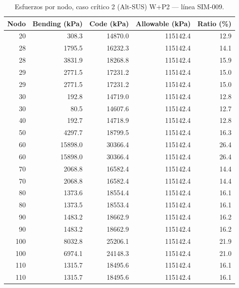 \begin{table}[htbp]
  \centering
  \footnotesize
  \caption{Esfuerzos por nodo, caso crítico 2 (Alt-SUS) W+P2 — línea SIM-009.}
  \label{tab:esfuerzos-critico}
  \begin{tabular}{rrrrr}
    \toprule
    Nodo & Bending (\si{kPa}) & Code (\si{kPa}) & Allowable (\si{kPa}) & Ratio (\%) \\
    \midrule
    20 & \num{308.3} & \num{14870.0} & \num{115142.4} & 12.9 \\
    28 & \num{1795.5} & \num{16232.3} & \num{115142.4} & 14.1 \\
    28 & \num{3831.9} & \num{18268.8} & \num{115142.4} & 15.9 \\
    29 & \num{2771.5} & \num{17231.2} & \num{115142.4} & 15.0 \\
    29 & \num{2771.5} & \num{17231.2} & \num{115142.4} & 15.0 \\
    30 & \num{192.8} & \num{14719.0} & \num{115142.4} & 12.8 \\
    30 & \num{80.5} & \num{14607.6} & \num{115142.4} & 12.7 \\
    40 & \num{192.7} & \num{14718.9} & \num{115142.4} & 12.8 \\
    50 & \num{4297.7} & \num{18799.5} & \num{115142.4} & 16.3 \\
    60 & \num{15898.0} & \num{30366.4} & \num{115142.4} & 26.4 \\
    60 & \num{15898.0} & \num{30366.4} & \num{115142.4} & 26.4 \\
    70 & \num{2068.8} & \num{16582.4} & \num{115142.4} & 14.4 \\
    70 & \num{2068.8} & \num{16582.4} & \num{115142.4} & 14.4 \\
    80 & \num{1373.6} & \num{18554.4} & \num{115142.4} & 16.1 \\
    80 & \num{1373.5} & \num{18553.4} & \num{115142.4} & 16.1 \\
    90 & \num{1483.2} & \num{18662.9} & \num{115142.4} & 16.2 \\
    90 & \num{1483.2} & \num{18662.9} & \num{115142.4} & 16.2 \\
    100 & \num{8032.8} & \num{25206.1} & \num{115142.4} & 21.9 \\
    100 & \num{6974.1} & \num{24148.3} & \num{115142.4} & 21.0 \\
    110 & \num{1315.7} & \num{18495.6} & \num{115142.4} & 16.1 \\
    110 & \num{1315.7} & \num{18495.6} & \num{115142.4} & 16.1 \\

\end{tabular}
\end{table}
